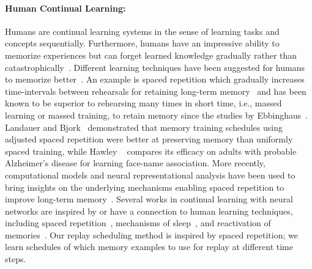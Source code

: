 \paragraph{Human Continual Learning:} Humans are continual learning systems in the sense of learning tasks and concepts sequentially. Furthermore, humans have an impressive ability to memorize experiences but can forget learned knowledge gradually rather than catastrophically~\cite{french1999catastrophic}. Different learning techniques have been suggested for humans to memorize better~\cite{dunlovsky2013improving, willis2007review}. An example is spaced repetition which gradually increases time-intervals between rehearsals for retaining long-term memory~\cite{dempster1989spacing} and has been known to be superior to rehearsing many times in short time, i.e., massed learning or massed training, to retain memory since the studies by Ebbinghaus~\cite{ebbinghaus2013memory}. Landauer and Bjork~\cite{landauer1978optimum} demonstrated that memory training schedules using adjusted spaced repetition were better at preserving memory than uniformly spaced training, while Hawley \etal~\cite{hawley2008comparison} compares its efficacy on adults with probable Alzheimer's disease for learning face-name association. More recently, computational models and neural representational analysis have been used to bring insights on the underlying mechanisms enabling spaced repetition to improve long-term memory~\cite{feng2019spaced, smolen2016right}. Several works in continual learning with neural networks are inspired by or have a connection to human learning techniques, including spaced repetition~\cite{feng2019spaced, smolen2016right}, mechanisms of sleep~\cite{ball2020study, schwarz2018progress}, and reactivation of memories~\cite{hayes2020remind, van2020brain}. Our replay scheduling method is inspired by spaced repetition; %
we learn schedules of which memory examples to use for replay at different time steps. 


